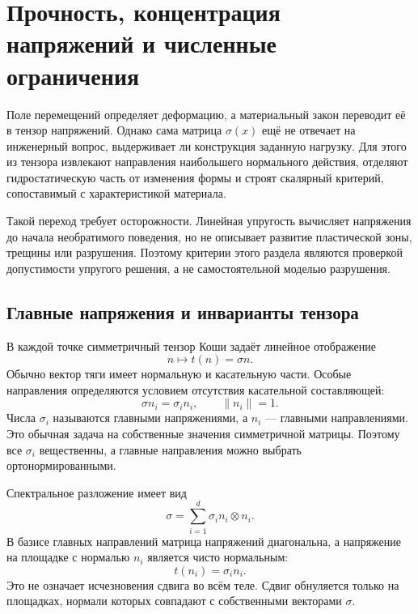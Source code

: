 \section{Прочность, концентрация напряжений и численные ограничения}
\label{sec:strength-stress-criteria}

Поле перемещений определяет деформацию, а материальный закон переводит её в тензор напряжений. Однако сама матрица $\sigma(x)$ ещё не отвечает на инженерный вопрос, выдерживает ли конструкция заданную нагрузку. Для этого из тензора извлекают направления наибольшего нормального действия, отделяют гидростатическую часть от изменения формы и строят скалярный критерий, сопоставимый с характеристикой материала.

Такой переход требует осторожности. Линейная упругость вычисляет напряжения до начала необратимого поведения, но не описывает развитие пластической зоны, трещины или разрушения. Поэтому критерии этого раздела являются проверкой допустимости упругого решения, а не самостоятельной моделью разрушения.

\subsection{Главные напряжения и инварианты тензора}

В каждой точке симметричный тензор Коши задаёт линейное отображение
\[
 n\longmapsto t(n)=\sigma n.
\]
Обычно вектор тяги имеет нормальную и касательную части. Особые направления определяются условием отсутствия касательной составляющей:
\begin{equation}
\label{eq:principal-stress-eigenproblem-v05}
 \sigma n_i=\sigma_i n_i,
 \qquad
 \lVert n_i\rVert=1.
\end{equation}
Числа $\sigma_i$ называются главными напряжениями, а $n_i$ --- главными направлениями. Это обычная задача на собственные значения симметричной матрицы. Поэтому все $\sigma_i$ вещественны, а главные направления можно выбрать ортонормированными.

Спектральное разложение имеет вид
\begin{equation}
\label{eq:stress-spectral-decomposition-v05}
 \sigma
 =\sum_{i=1}^{d}\sigma_i n_i\otimes n_i.
\end{equation}
В базисе главных направлений матрица напряжений диагональна, а напряжение на площадке с нормалью $n_i$ является чисто нормальным:
\[
 t(n_i)=\sigma_i n_i.
\]
Это не означает исчезновения сдвига во всём теле. Сдвиг обнуляется только на площадках, нормали которых совпадают с собственными векторами $\sigma$.

